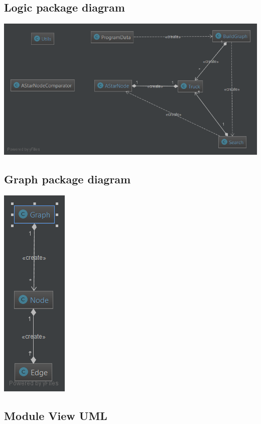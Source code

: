 \documentclass[a4paper]{article}
\begin{document}
\subsection{Logic package diagram}\label{lpdUML}

\begin{center}
\includegraphics[scale=0.5]{../../diagrams/package_logic_diagram.png}
\end{center}

\subsection{Graph package diagram}\label{gpdUML}

\begin{center}
\includegraphics[scale=0.5]{../../diagrams/package_graph_diagram.png}
\end{center}

\subsection{Module View UML}\label{mvUML}
\end{document}
